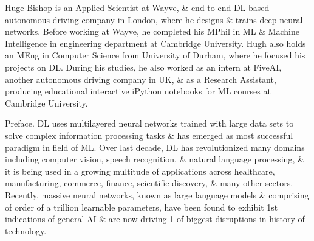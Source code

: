 \documentclass{article}
\begin{document}
\begin{itemize}
	{\sc Huge Bishop} is an Applied Scientist at Wayve, \& end-to-end DL based autonomous driving company in London, where he designs \& trains deep neural networks. Before working at Wayve, he completed his MPhil in ML \& Machine Intelligence in engineering department at Cambridge University. {\sc Hugh} also holds an MEng in Computer Science from University of Durham, where he focused his projects on DL. During his studies, he also worked as an intern at FiveAI, another autonomous driving company in UK, \& as a Research Assistant, producing educational interactive iPython notebooks for ML courses at Cambridge University.
\end{itemize}
{\sf Preface.} DL uses multilayered neural networks trained with large data sets to solve complex information processing tasks \& has emerged as most successful paradigm in field of ML. Over last decade, DL has revolutionized many domains including computer vision, speech recognition, \& natural language processing, \& it is being used in a growing multitude of applications across healthcare, manufacturing, commerce, finance, scientific discovery, \& many other sectors. Recently, massive neural networks, known as large language models \& comprising of order of a trillion learnable parameters, have been found to exhibit 1st indications of general AI \& are now driving 1 of biggest disruptions in history of technology.
\end{document}
